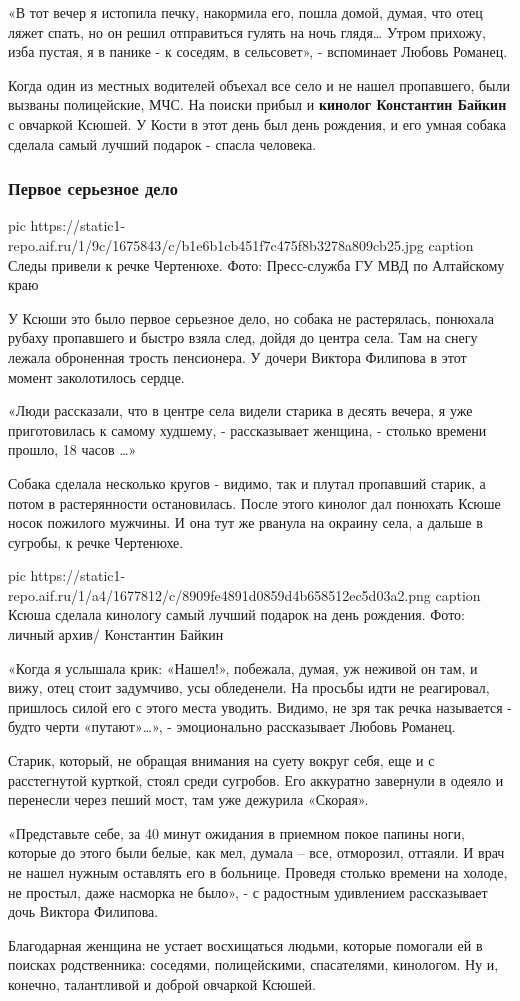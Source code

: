 «В тот вечер я истопила печку, накормила его, пошла домой, думая, что отец
ляжет спать, но он решил отправиться гулять на ночь глядя… Утром прихожу, изба
пустая, я в панике - к соседям, в сельсовет», - вспоминает Любовь Романец.

Когда один из местных водителей объехал все село и не нашел пропавшего, были
вызваны полицейские, МЧС. На поиски прибыл и \textbf{кинолог Константин Байкин} с
овчаркой Ксюшей. У Кости в этот день был день рождения, и его умная собака
сделала самый лучший подарок - спасла человека.

\subsubsection{Первое серьезное дело}

\ifcmt
pic https://static1-repo.aif.ru/1/9c/1675843/c/b1e6b1cb451f7c475f8b3278a809cb25.jpg
caption Следы привели к речке Чертенюхе. Фото: Пресс-служба ГУ МВД по Алтайскому краю  
\fi

У Ксюши это было первое серьезное дело, но собака не растерялась, понюхала
рубаху пропавшего и быстро взяла след, дойдя до центра села. Там на снегу
лежала оброненная трость пенсионера. У дочери Виктора Филипова в этот момент
заколотилось сердце.

«Люди рассказали, что в центре села видели старика в десять вечера, я уже
приготовилась к самому худшему, - рассказывает женщина,  - столько времени
прошло, 18 часов …»

Собака сделала несколько кругов - видимо, так и плутал пропавший старик, а
потом в растерянности остановилась. После этого кинолог дал понюхать Ксюше
носок пожилого мужчины. И она тут же рванула на окраину села, а дальше в
сугробы, к речке Чертенюхе.

\ifcmt
pic https://static1-repo.aif.ru/1/a4/1677812/c/8909fe4891d0859d4b658512ec5d03a2.png 
caption Ксюша сделала кинологу самый лучший подарок на день рождения. Фото: личный архив/ Константин Байкин
\fi

«Когда я услышала крик: «Нашел!», побежала, думая, уж неживой он там, и вижу,
отец стоит задумчиво, усы обледенели. На просьбы идти не реагировал, пришлось
силой его с этого места уводить. Видимо, не зря так речка называется - будто
черти «путают»…», - эмоционально рассказывает Любовь Романец.

Старик, который, не обращая внимания на суету вокруг себя, еще и с расстегнутой
курткой, стоял среди сугробов. Его аккуратно завернули в одеяло и перенесли
через пеший мост, там уже дежурила «Скорая».

«Представьте себе, за 40 минут ожидания в приемном покое папины ноги, которые
до этого были белые, как мел, думала – все, отморозил, оттаяли. И врач не нашел
нужным оставлять его в больнице. Проведя столько времени на холоде, не простыл,
даже насморка не было», - с радостным  удивлением рассказывает дочь Виктора
Филипова.

Благодарная женщина не устает восхищаться людьми, которые помогали ей в поисках
родственника: соседями, полицейскими, спасателями, кинологом. Ну и, конечно,
талантливой и доброй овчаркой Ксюшей.

